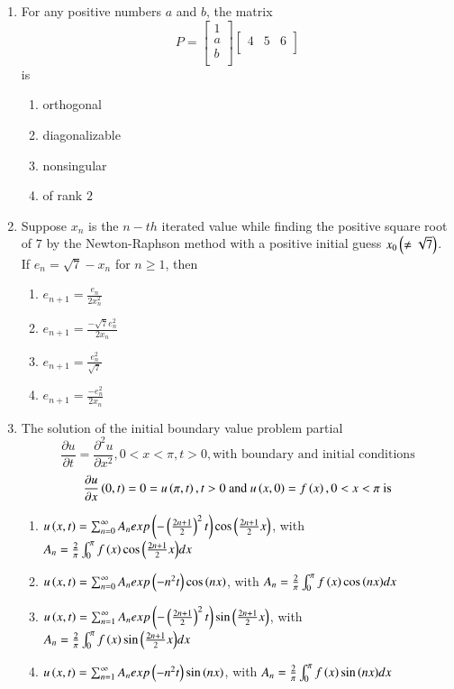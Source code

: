 \documentclass[journal]{IEEEtran}
\begin{document}
\begin{enumerate}
\item For any positive numbers $a$ and $b$, the matrix $$P=\begin{bmatrix}
1\\a\\b\\
\end{bmatrix}
\begin{bmatrix}
4&5&6\\
\end{bmatrix}$$ is
\begin{multicols}{2}
\begin{enumerate}
\item orthogonal
\item diagonalizable
\item nonsingular
\item of rank $2$
\end{enumerate}
\end{multicols}


\item Suppose $x_{n}$ is the $n-th$ iterated value while finding the positive square root of $7$ by the Newton-Raphson method with a positive initial guess $x_{0}\left(\neq \sqrt{7}\right)$. If $e_{n}=\sqrt{7}-x_{n}$ for $n\geq 1$, then
\begin{multicols}{2}
\begin{enumerate}
\item $e_{n+1}=\frac{e_{n}}{2x_{n}^{2}}$
\item $e_{n+1}=\frac{-\sqrt{7}e_{n}^{2}}{2x_{n}}$
\item $e_{n+1}=\frac{e_{n}^{2}}{\sqrt{7}}$
\item $e_{n+1}=\frac{-e_{n}^{2}}{2x_{n}}$
\end{enumerate}
\end{multicols}

\item The solution of the initial boundary value problem partial $$\frac{\partial u}{\partial t}=\frac{\partial^{2}u}{\partial x^{2}},0<x<\pi,t>0,\text{with boundary and initial conditions}$$ $$\frac{\partial u}{\partial x}\left(0,t\right)=0=u\left(\pi,t\right),t>0\text{ and }u\left(x,0\right)=f\left(x\right),0<x<\pi\text{ is}$$
\begin{enumerate}
\item $u\left(x,t\right)=\sum_{n=0}^{\infty}A_{n}exp\left(-\left(\frac{2n+1}{2}\right)^{2}t\right)\cos{\ensuremath{\left(\frac{2n+1}{2}x\right)}}$, with $A_{n}=\frac{2}{\pi}\int_{0}^{\pi}f\left(x\right)\cos{\ensuremath{\left(\frac{2n+1}{2}x\right)}}dx$
\item $u\left(x,t\right)=\sum_{n=0}^{\infty}A_{n}exp\left(-n^{2}t\right)\cos{\ensuremath{\left(nx\right)}}$, with $A_{n}=\frac{2}{\pi}\int_{0}^{\pi}f\left(x\right)\cos{\ensuremath{\left(nx\right)}}dx$
\item $u\left(x,t\right)=\sum_{n=1}^{\infty}A_{n}exp\left(-\left(\frac{2n+1}{2}\right)^{2}t\right)\sin{\ensuremath{\left(\frac{2n+1}{2}x\right)}}$, with $A_{n}=\frac{2}{\pi}\int_{0}^{\pi}f\left(x\right)\sin{\ensuremath{\left(\frac{2n+1}{2}x\right)}}dx$
\item $u\left(x,t\right)=\sum_{n=1}^{\infty}A_{n}exp\left(-n^{2}t\right)\sin{\ensuremath{\left(nx\right)}}$, with $A_{n}=\frac{2}{\pi}\int_{0}^{\pi}f\left(x\right)\sin{\ensuremath{\left(nx\right)}}dx$
\end{enumerate}


\end{enumerate}
\end{document}

